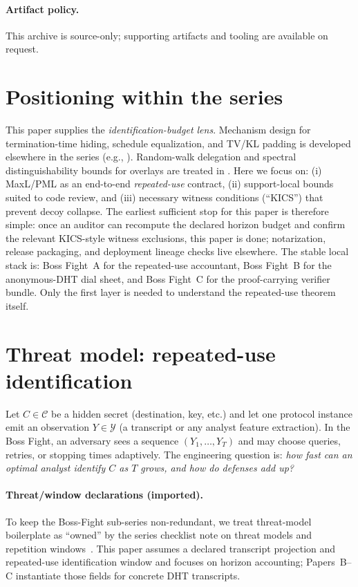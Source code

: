 \documentclass[11pt]{article}
\newcommand{\C}{\mathcal{C}} %
\newcommand{\Y}{\mathcal{Y}} %
\begin{document}
\paragraph{Artifact policy.}
This archive is source-only; supporting artifacts and tooling are available on request.\cite{series:artifactpolicy}


\section{Positioning within the series}\label{sec:series}
This paper supplies the \emph{identification-budget lens}.
Mechanism design for termination-time hiding, schedule equalization, and TV/KL padding is developed elsewhere in the series
(e.g., \cite{series:schedcompiler,series:knapsacktransport,series:prefixcapacities,series:manytestinglowerbounds,series:stoptimeaddendum}).
Random-walk delegation and spectral distinguishability bounds for overlays are treated in \cite{series:spectral}.
Here we focus on:
(i) MaxL/PML as an end-to-end \emph{repeated-use} contract,
(ii) support-local bounds suited to code review, and
(iii) necessary witness conditions (``KICS'') that prevent decoy collapse.
The earliest sufficient stop for this paper is therefore simple: once an auditor can recompute the declared horizon budget and confirm the relevant KICS-style witness exclusions, this paper is done; notarization, release packaging, and deployment lineage checks live elsewhere.\cite{series:evalnotary,series:abomoinl,series:releaseproperty}
The stable local stack is: Boss Fight~A for the repeated-use accountant, Boss Fight~B for the anonymous-DHT dial sheet, and Boss Fight~C for the proof-carrying verifier bundle.
Only the first layer is needed to understand the repeated-use theorem itself.

\section{Threat model: repeated-use identification}\label{sec:bossfight}
Let $C\in\C$ be a hidden secret (destination, key, etc.) and let one protocol instance emit an observation $Y\in\Y$ (a transcript or any analyst feature extraction).
In the Boss Fight, an adversary sees a sequence $(Y_1,\dots,Y_T)$ and may choose queries, retries, or stopping times adaptively.
The engineering question is: \emph{how fast can an optimal analyst identify $C$ as $T$ grows, and how do defenses add up?}

\paragraph{Threat/window declarations (imported).}
To keep the Boss-Fight sub-series non-redundant, we treat threat-model boilerplate as ``owned'' by the series checklist note on threat models and repetition windows~\cite{series:threatwindows}.
This paper assumes a declared transcript projection and repeated-use identification window and focuses on horizon accounting; Papers~B--C instantiate those fields for concrete DHT transcripts.
\end{document}
